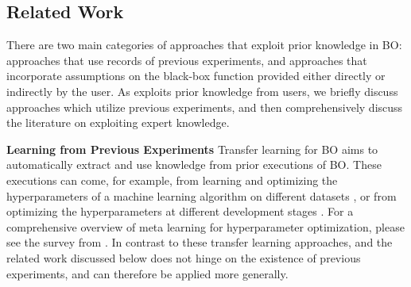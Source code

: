 \documentclass{article}
\newcommand{\frank}[1]{\todo[color=yellow]{Frank: #1}} %
\newcommand{\carl}[1]{{\todo[color=purple]{Carl: #1}}}
\newcommand{\danny}[1]{\todo[color=red]{Danny: #1}}
\newcommand{\method}[0]{\text{${\pi}$BO}\xspace}
\begin{document}
\subsection{Related Work}\label{related}

There are two main categories of approaches that exploit prior knowledge in BO: approaches that use records of previous experiments, and approaches that incorporate assumptions on the black-box function provided either directly or indirectly by the user. As \method exploits prior knowledge from users, we briefly discuss approaches which utilize previous experiments, and then comprehensively discuss the literature on exploiting expert knowledge.

\textbf{Learning from Previous Experiments}\quad
Transfer learning for BO aims to automatically extract and use knowledge from prior executions of BO.
These executions can come, for example, from learning and optimizing the hyperparameters of a machine learning algorithm on different datasets \citep{rijn2018importance, swersky-nips13a,wistuba-pkdd15a,Perrone2019LearningSS,Feurer2015InitializingBH,feurer2018practical}, or from optimizing the hyperparameters at different development stages \citep{stoll2020meta}.
For a comprehensive overview of meta learning for hyperparameter optimization, please see the survey from \citet{vanschoren2018metalearning}.
In contrast to these transfer learning approaches, \method and the related work discussed below does not hinge on the existence of previous experiments, and can therefore be applied more generally.
\end{document}
